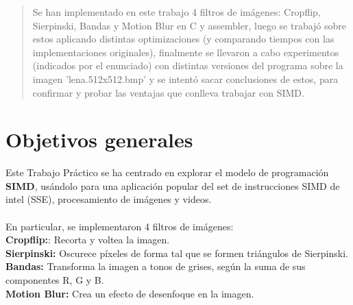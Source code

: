 \documentclass[a4paper]{article}
\begin{document}
\thispagestyle{empty}

\maketitle
\newpage

\thispagestyle{empty}
\vfill
\begin{abstract}

Se han implementado en este trabajo 4 filtros de im\'{a}genes: Cropflip, Sierpinski, Bandas y Motion Blur en C y assembler, luego se trabaj\'{o} sobre estos aplicando distintas optimizaciones (y comparando tiempos con las implementaciones originales), finalmente se llevaron a cabo experimentos (indicados por el enunciado) con distintas versiones del programa sobre la imagen 'lena.512x512.bmp' y se intent\'{o} sacar conclusiones de estos, para confirmar y probar las ventajas que conlleva trabajar con SIMD.

\end{abstract}

\thispagestyle{empty}
\vspace{3cm}
\tableofcontents
\newpage


\newpage

\section{Objetivos generales}

Este Trabajo Pr\'{a}ctico se ha centrado en explorar el modelo de programaci\'{o}n \textbf{SIMD}, us\'{a}ndolo para una aplicaci\'{o}n popular del set de instrucciones SIMD de intel (SSE), procesamiento de im\'{a}genes y videos.\\ \\
En particular, se implementaron 4 filtros de im\'{a}genes: \\
\textbf{Cropflip:}: Recorta y voltea la imagen. \\
\textbf{Sierpinski:} Oscurece píxeles de forma tal que se formen triángulos de Sierpinski.\\
\textbf{Bandas:} Transforma la imagen a tonos de grises, según la suma de sus componentes R, G y B. \\
\textbf{Motion Blur:} Crea un efecto de desenfoque en la imagen.\\
\end{document}
